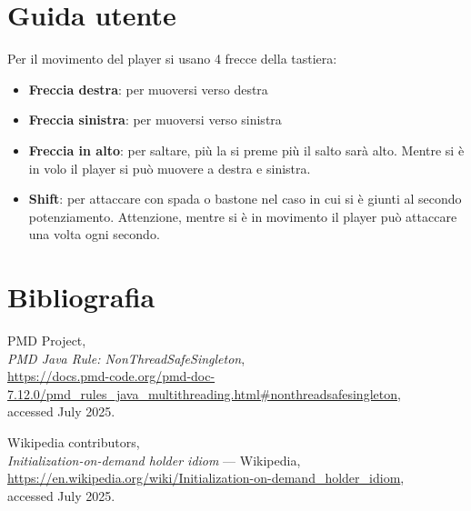 \documentclass[a4paper,12pt]{report}
\begin{document}
\chapter{Guida utente}
Per il movimento del player si usano 4 frecce della tastiera:
\begin{itemize}
    \item \textbf{Freccia destra}: per muoversi verso destra
    \item \textbf{Freccia sinistra}: per muoversi verso sinistra
    \item \textbf{Freccia in alto}: per saltare, più la si preme più il salto sarà alto.
    Mentre si è in volo il player si può muovere a destra e sinistra.
    \item \textbf{Shift}: per attaccare con spada o bastone nel caso in cui si è giunti al secondo potenziamento.
    Attenzione, mentre si è in movimento il player può attaccare una volta ogni secondo.
\end{itemize}
\chapter{Bibliografia}
\begin{thebibliography}{9}

    PMD Project,\\
    \emph{PMD Java Rule: NonThreadSafeSingleton},\\
    \url{https://docs.pmd-code.org/pmd-doc-7.12.0/pmd_rules_java_multithreading.html#nonthreadsafesingleton},\\
    accessed July 2025.
    
    Wikipedia contributors,\\
    \emph{Initialization-on-demand holder idiom} --- Wikipedia,\\
    \url{https://en.wikipedia.org/wiki/Initialization-on-demand_holder_idiom},\\
    accessed July 2025.

    \end{thebibliography}
\end{document}
